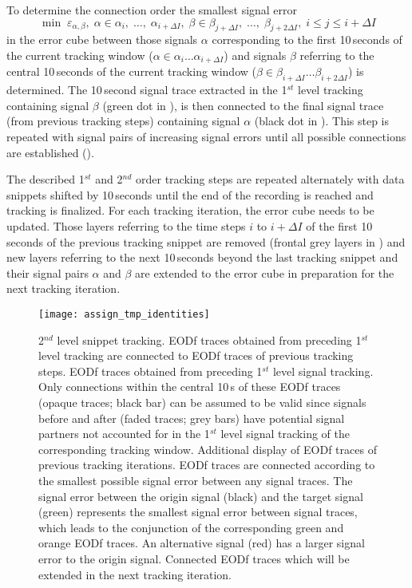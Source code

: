 To determine the connection order the smallest signal error 
\begin{equation}\label{min_e_snippet_connect}
  \min \; \varepsilon_{\alpha, \beta}, \; \alpha \in \alpha_i,\;\dots,\;\alpha_{i + \Delta I}, \; \beta \in \beta_{j + \Delta I},\;\dots,\;\beta_{j + 2\Delta I}, \; i \leq j \leq i + \Delta I 
\end{equation}
in the error cube between those signals $\alpha$ corresponding to the first 10\,seconds of the current tracking window ($\alpha \in \alpha_i \dots \alpha_{i + \Delta I}$) and signals $\beta$ referring to the central 10\,seconds of the current tracking window ($\beta \in \beta_{i + \Delta I} \dots \beta_{i + 2\Delta I}$) is determined. The 10\,second signal trace extracted in the 1$^{st}$ level tracking containing signal $\beta$ (green dot in ), is then connected to the final  signal trace (from previous tracking steps) containing signal $\alpha$ (black dot in ). This step is repeated with signal pairs of increasing signal errors until all possible connections are established (). 

The described 1$^{st}$ and 2$^{nd}$ order tracking steps are repeated alternately with data snippets shifted by 10\,seconds until the end of the recording is reached and tracking is finalized. For each tracking iteration, the error cube needs to be updated. Those layers referring to the time steps $i$ to $i + \Delta I$ of the first 10\,seconds of the previous tracking snippet are removed (frontal grey layers in ) and new layers referring to the next 10\,seconds beyond the last tracking snippet and their signal pairs $\alpha$ and $\beta$ are extended to the error cube in preparation for the next tracking iteration.


\begin{figure}[h!]
  \centerline{\texttt{[image: assign\_tmp\_identities]}}
  \caption{\label{running_connection} 2$^{nd}$ level snippet tracking. EODf traces obtained from preceding 1$^{st}$ level tracking are connected to EODf traces of previous tracking steps.  EODf traces obtained from preceding 1$^{st}$ level signal tracking. Only connections within the central 10\,s of these EODf traces (opaque traces; black bar) can be assumed to be valid since signals before and after (faded traces; grey bars) have potential signal partners not accounted for in the 1$^{st}$ level signal tracking of the corresponding tracking window.  Additional display of EODf traces of previous tracking iterations.  EODf traces are connected according to the smallest possible signal error between any signal traces. The signal error between the origin signal (black) and the target signal (green) represents the smallest signal error between signal traces, which leads to the conjunction of the corresponding green and orange EODf traces. An alternative signal (red) has a larger signal error to the origin signal.  Connected EODf traces which will be extended in the next tracking iteration. }
\end{figure}

